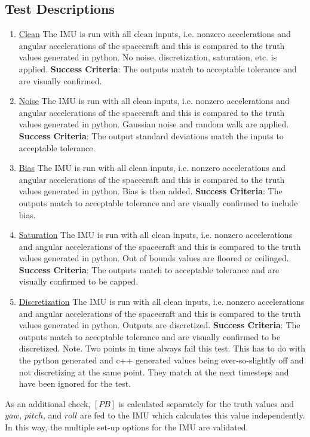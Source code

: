\subsection{Test Descriptions}
\begin{enumerate}
	\item \underline{Clean} The IMU is run with all clean inputs, i.e. nonzero accelerations and angular accelerations of the spacecraft and this is compared to the truth values generated in python. No noise, discretization, saturation, etc. is applied.
	\subitem \textbf{Success Criteria}: The outputs match to acceptable tolerance and are visually confirmed.
	\item \underline{Noise} The IMU is run with all clean inputs, i.e. nonzero accelerations and angular accelerations of the spacecraft and this is compared to the truth values generated in python. Gaussian noise and random walk are applied.
	\subitem \textbf{Success Criteria}: The output standard deviations match the inputs to acceptable tolerance.
	\item \underline{Bias} The IMU is run with all clean inputs, i.e. nonzero accelerations and angular accelerations of the spacecraft and this is compared to the truth values generated in python. Bias is then added.
	\subitem \textbf{Success Criteria}: The outputs match to acceptable tolerance and are visually confirmed to include bias.
	\item \underline{Saturation} The IMU is run with all clean inputs, i.e. nonzero accelerations and angular accelerations of the spacecraft and this is compared to the truth values generated in python. Out of bounds values are floored or ceilinged.
	\subitem \textbf{Success Criteria}: The outputs match to acceptable tolerance and are visually confirmed to be capped.
	\item \underline{Discretization} The IMU is run with all clean inputs, i.e. nonzero accelerations and angular accelerations of the spacecraft and this is compared to the truth values generated in python. Outputs are discretized.
	\subitem \textbf{Success Criteria}: The outputs match to acceptable tolerance and are visually confirmed to be discretized. Note. Two points in time always fail this test. This has to do with the python generated and c++ generated values being ever-so-slightly off and not discretizing at the same point. They match at the next timesteps and have been ignored for the test.
\end{enumerate} 
As an additional check, $[PB]$ is calculated separately for the truth values and $yaw$, $pitch$, and $roll$ are fed to the IMU which calculates this value independently. In this way, the multiple set-up options for the IMU are validated.


